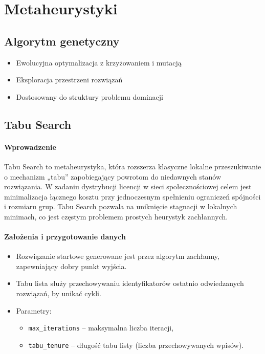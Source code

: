 \section{Metaheurystyki}

\subsection{Algorytm genetyczny}
\begin{itemize}
  \item Ewolucyjna optymalizacja z krzyżowaniem i mutacją
  \item Eksploracja przestrzeni rozwiązań
  \item Dostosowany do struktury problemu dominacji
\end{itemize}

\subsection{Tabu Search}

\paragraph{Wprowadzenie}  
Tabu Search to metaheurystyka, która rozszerza klasyczne lokalne przeszukiwanie o mechanizm „tabu” zapobiegający powrotom do niedawnych stanów rozwiązania. W zadaniu dystrybucji licencji w sieci społecznościowej celem jest minimalizacja łącznego kosztu przy jednoczesnym spełnieniu ograniczeń spójności i rozmiaru grup. Tabu Search pozwala na uniknięcie stagnacji w lokalnych minimach, co jest częstym problemem prostych heurystyk zachłannych.

\paragraph{Założenia i przygotowanie danych}  
\begin{itemize}
  \item Rozwiązanie startowe generowane jest przez algorytm zachłanny, zapewniający dobry punkt wyjścia.
  \item Tabu lista służy przechowywaniu identyfikatorów ostatnio odwiedzanych rozwiązań, by unikać cykli.
  \item Parametry:
    \begin{itemize}
      \item \texttt{max\_iterations} – maksymalna liczba iteracji,  
      \item \texttt{tabu\_tenure} – długość tabu listy (liczba przechowywanych wpisów).
    \end{itemize}
\end{itemize}

